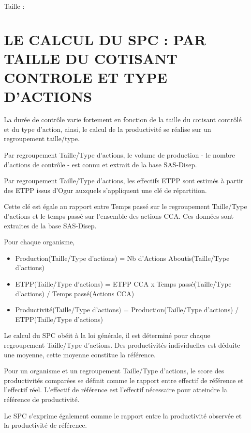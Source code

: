 \documentclass[
]{book}
\begin{document}
Taille :

\hypertarget{le-calcul-du-spc-par-taille-du-cotisant-controle-et-type-dactions}{%
\section{LE CALCUL DU SPC : PAR TAILLE DU COTISANT CONTROLE ET TYPE D'ACTIONS}\label{le-calcul-du-spc-par-taille-du-cotisant-controle-et-type-dactions}}

La durée de contrôle varie fortement en fonction de la taille du cotisant contrôlé et du type d'action, ainsi, le calcul de la productivité se réalise sur un regroupement taille/type.

Par regroupement Taille/Type d'actions, le volume de production - le nombre d'actions de contrôle - est connu et extrait de la base SAS-Disep.

Par regroupement Taille/Type d'actions, les effectifs ETPP sont estimés à partir des ETPP issus d'Ogur auxquels s'appliquent une clé de répartition.

Cette clé est égale au rapport entre Temps passé sur le regroupement Taille/Type d'actions et le temps passé sur l'ensemble des actions CCA. Ces données sont extraites de la base SAS-Disep.

Pour chaque organisme,

\begin{itemize}
\item
  Production(Taille/Type d'actions) = Nb d'Actions Aboutis(Taille/Type d'actions)
\item
  ETPP(Taille/Type d'actions) = ETPP CCA x Temps passé(Taille/Type d'actions) / Temps passé(Actions CCA)
\item
  Productivité(Taille/Type d'actions) = Production(Taille/Type d'actions) / ETPP(Taille/Type d'actions)
\end{itemize}

Le calcul du SPC obéit à la loi générale, il est déterminé pour chaque regroupement Taille/Type d'actions. Des productivités individuelles est déduite une moyenne, cette moyenne constitue la référence.

Pour un organisme et un regroupement Taille/Type d'actions, le score des productivités comparées se définit comme le rapport entre effectif de référence et l'effectif réel. L'effectif de référence est l'effectif nécessaire pour atteindre la référence de productivité.

Le SPC s'exprime également comme le rapport entre la productivité observée et la productivité de référence.
\end{document}
